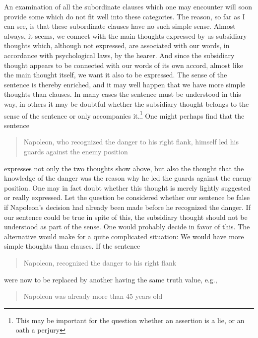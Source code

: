\documentclass[twoside,12pt]{article}
\begin{document}
An examination of all the subordinate clauses which one may encounter
will soon provide some which do not fit well into these categories.
The reason, so far as I can see, is that these subordinate clauses
have no such simple sense. Almost always, it seems, we connect with
the main thoughts expressed by us subsidiary thoughts which, although
not expressed, are associated with our words, in accordance with
psychological laws, by the hearer. And since the subsidiary thought
appears to be connected with our words of its own accord, almost like
the main thought itself, we want it also to be expressed. The sense of
the sentence is thereby enriched, and it may well happen that we have
more simple thoughts than clauses. In many cases the sentence must be
understood in this way, in others it may be doubtful whether the
subsidiary thought belongs to the sense of the sentence or only
accompanies it.\footnote[14]{This may be important for the question
  whether an assertion is a lie, or an oath a perjury} One might
perhaps find that the sentence

\begin{quote}
  Napoleon, who recognized the danger to his right flank, himself led
  his guards against the enemy position
\end{quote}

\noindent expresses not only the two thoughts show above, but also the
thought that the knowledge of the danger was the reason why he led the
guards against the enemy position. One may in fact doubt whether this
thought is merely lightly suggested or really expressed. Let the
question be considered whether our sentence be false if Napoleon's
decision had already been made before he recognized the danger. If our
sentence could be true in spite of this, the subsidiary thought should
not be understood as part of the sense. One would probably decide in
favor of this. The alternative would make for a quite complicated
situation: We would have more simple thoughts than clauses. If the
sentence

\begin{quote}
  Napoleon, recognized the danger to his right flank
\end{quote}

\noindent were now to be replaced by another having the same truth
value, e.g.,

\begin{quote}
  Napoleon was already more than 45 years old
\end{quote}
\end{document}
